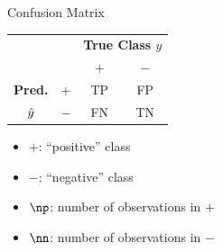 \documentclass[11pt,compress,t,notes=noshow, xcolor=table]{beamer}
\begin{document}
%
%

%
%


\begin{vbframe}{Confusion Matrix}

\begin{center}
\small
\renewcommand{\arraystretch}{1.5}
\begin{tabular}{cc||cc}
    & & \multicolumn{2}{c}{\bfseries True Class $y$}  \\
    & & $+$ & $-$  \\
    \hline \hline
    \bfseries Pred.     & $+$ & TP & FP\\
              $\hat{y}$ & $-$ & FN & TN\\
\end{tabular}
\renewcommand{\arraystretch}{1}
\end{center}

\begin{itemize}
  \item $+$: \enquote{positive} class
  \item $-$: \enquote{negative} class
  \item $\np$: number of observations in $+$
  \item $\nn$: number of observations in $-$
\end{itemize}
\end{vbframe}
\end{document}
